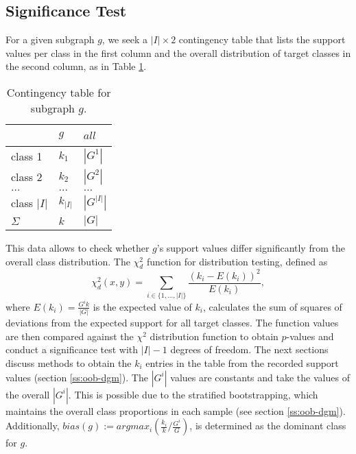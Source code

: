\documentclass{article}
\begin{document}
\subsection{Significance Test}
\label{ss:significance-test}
For a given subgraph $g$, we seek a $|I| \times 2$ contingency table that lists the
support values per class in the first column and the overall distribution of target
classes in the second column, as in Table \ref{t-ContingencyTableIndTest}.
\begin{table}[t]
  \centering
  \begin{tabular}{|l|l|l|}
    \hline
    ~           &	$g$       & $all$       \\\hline
    class 1	    &	$k_1$     & $|G^1|$     \\\hline
    class 2 	  &	$k_2$     & $|G^2|$     \\\hline
    $\ldots$ 	  &	$\ldots$  & $\ldots$    \\\hline
    class $|I|$	&	$k_{|I|}$ & $|G^{|I|}|$ \\\hline
    $\Sigma$	  &	$k$       & $|G|$       \\\hline
  \end{tabular}
  \caption[]{Contingency table for subgraph $g$.}
  \label{t-ContingencyTableIndTest}
\end{table}
This data allows to check whether $g$'s support values differ
significantly from the overall class distribution.  The $\chi^2_d$ function for
distribution testing, defined as
\begin{equation}
  \chi^2_d(x,y) = \sum_{i \in \{1,\ldots,|I|\}} \frac{(k_i-E(k_i))^2}{E(k_i)},
  \label{eq:chid}
\end{equation} 
where $E(k_i)=\frac{G^{i}k}{|G|}$ is the expected value of $k_i$, calculates
the sum of squares of deviations from the expected support for all target
classes. The function values are then compared against the $\chi^2$
distribution function to obtain $p$-values and conduct a significance test with
$|I|-1$ degrees of freedom.  The next sections discuss methods to obtain the
$k_i$ entries in the table from the recorded support values (section
\ref{ss:oob-dgm}).  The $|G^{i}|$ values are constants and take the values of
the overall $|G^{i}|$.  This is possible due to the stratified bootstrapping,
which maintains the overall class proportions in each sample (see section
\ref{ss:oob-dgm}). Additionally, $bias(g) := arg max_i(\frac{k_i}{k}/\frac{G^i}{G})$, is determined as the dominant class for $g$.
\end{document}
